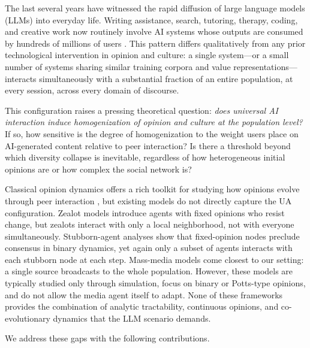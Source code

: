 \documentclass{article}
\theoremstyle{plain}
\theoremstyle{definition}
\theoremstyle{remark}
\begin{document}
The last several years have witnessed the rapid diffusion of large language
models (LLMs) into everyday life. Writing assistance, search, tutoring,
therapy, coding, and creative work now routinely involve AI systems whose
outputs are consumed by hundreds of millions of users \citep{sharma2024}.
This pattern differs qualitatively from any prior technological intervention
in opinion and culture: a single system---or a small number of systems
sharing similar training corpora and value representations---interacts
simultaneously with a substantial fraction of an entire population, at
every session, across every domain of discourse.

This configuration raises a pressing theoretical question: \emph{does
universal AI interaction induce homogenization of opinion and culture at
the population level?} If so, how sensitive is the degree of homogenization
to the weight users place on AI-generated content relative to peer
interaction? Is there a threshold beyond which diversity collapse is
inevitable, regardless of how heterogeneous initial opinions are or how
complex the social network is?

Classical opinion dynamics offers a rich toolkit for studying how
opinions evolve through peer interaction \citep{castellano2009}, but
existing models do not directly capture the UA configuration. Zealot models
\citep{mobilia2003, mobilia2007} introduce agents with fixed opinions who
resist change, but zealots interact with only a local neighborhood, not with
everyone simultaneously. Stubborn-agent analyses \citep{acemoglu2013binary}
show that fixed-opinion nodes preclude consensus in binary dynamics, yet
again only a subset of agents interacts with each stubborn node at each step.
Mass-media models \citep{crokidakis2014, chica2023} come closest to our
setting: a single source broadcasts to the whole population. However, these
models are typically studied only through simulation, focus on binary or
Potts-type opinions, and do not allow the media agent itself to adapt. None
of these frameworks provides the combination of analytic tractability,
continuous opinions, and co-evolutionary dynamics that the LLM scenario demands.

We address these gaps with the following contributions.
\end{document}
